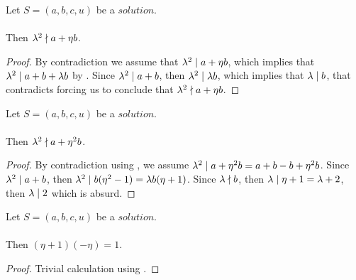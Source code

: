 \begin{lemma}
    \label{lmm:lambda_sq_not_dvd_a_add_eta_mul_b}
    \leanok
    Let $S=(a, b, c, u)$ be a $solution$.\\\\
    Then $\lambda^2 \nmid a + \eta b$.
\end{lemma}
\begin{proof}
    \leanok
    By contradiction we assume that $\lambda^2 \mid a + \eta b$, which implies that
    $\lambda^2 \mid a + b + \lambda  b$ by .
    Since $\lambda^2 \mid a+b$, then $\lambda^2 \mid \lambda  b$, which implies that
    $\lambda \mid b$, that contradicts  forcing us to conclude that
    $\lambda^2 \nmid a + \eta b$.
\end{proof}

\begin{lemma}
    \label{lmm:lambda_sq_not_dvd_a_add_eta_sq_mul_b}
    \leanok
    Let $S=(a, b, c, u)$ be a $solution$.\\\\
    Then $\lambda^2 \nmid a + \eta^2  b$.
\end{lemma}
\begin{proof}
    \leanok
    By contradiction using , we assume
    $\lambda^2 \mid a +\eta^2 b = a + b -b + \eta^2  b$.
    Since $\lambda^2 \mid a+b$, then $\lambda^2 \mid b (\eta^2 -1)
    = \lambda b (\eta + 1)$. Since $\lambda \nmid b$, then
    $\lambda \mid \eta+1 = \lambda +2$, then $\lambda \mid 2$ which is absurd.
\end{proof}

\begin{lemma}
    \label{lmm:eta_add_one_inv}
    \leanok
    Let $S=(a, b, c, u)$ be a $solution$.\\\\
    Then $(\eta + 1)  (-\eta) = 1$.
\end{lemma}
\begin{proof}
    \leanok
    Trivial calculation using .
\end{proof}

